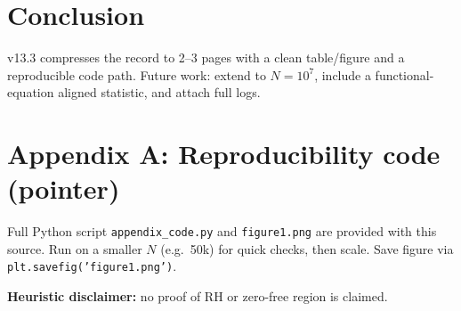 \documentclass[11pt]{article}
\begin{document}
\section*{Conclusion}
v13.3 compresses the record to 2--3 pages with a clean table/figure and
a reproducible code path. Future work: extend to $N\!=\!10^7$, include a
functional-equation aligned statistic, and attach full logs.

\appendix
\section*{Appendix A: Reproducibility code (pointer)}
Full Python script \texttt{appendix\_code.py} and \texttt{figure1.png} are provided with this source.
Run on a smaller $N$ (e.g.\ 50k) for quick checks, then scale. Save figure via
\texttt{plt.savefig('figure1.png')}.
\vspace{4pt}

\noindent\textbf{Heuristic disclaimer:} no proof of RH or zero-free region is claimed.
\end{document}
